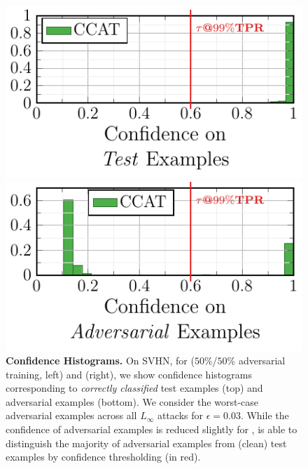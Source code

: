 \begin{figure}[t]
\begin{minipage}[t]{0.225\textwidth}
        \centering
        \includegraphics[width=1\textwidth]{fig_msvhn_corr_ours10}
        \vspace*{-14px}
        
        \includegraphics[width=1\textwidth]{fig_msvhn_succ_ours10}
    \end{minipage}
    
    \vspace*{-8px}
    \caption{\textbf{Confidence Histograms.} On SVHN, for \AdvTrain ($50\%$/$50\%$ adversarial training, left) and \ConfTrain (right), we show confidence histograms corresponding to \emph{correctly classified} test examples (top) and adversarial examples (bottom). We consider the worst-case adversarial examples across all $L_\infty$ attacks for $\epsilon = 0.03$. While the confidence of adversarial examples is reduced slightly for \AdvTrain, \ConfTrain is able to distinguish the majority of adversarial examples from (clean) test examples by confidence thresholding (in \textcolor{colorbrewer1}{red}).}
    \label{fig:experiments-histograms}
    \vspace*{-8px}
\end{figure}

